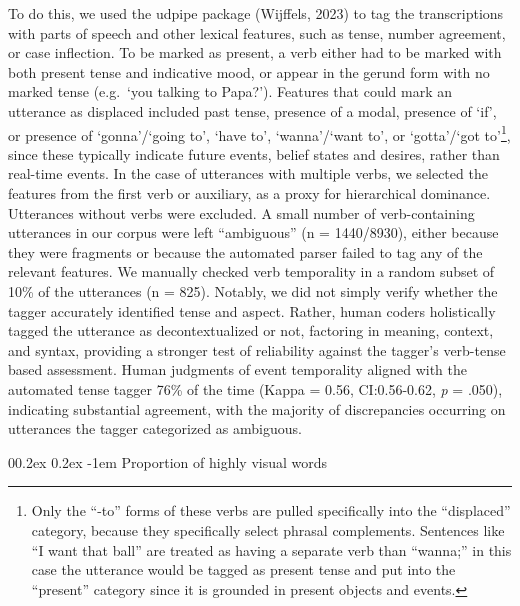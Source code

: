 \documentclass[
  man,floatsintext]{apa6}
\makeatletter
\let\oldparagraph\paragraph
\renewcommand{\paragraph}[1]{\oldparagraph{#1}\mbox{}}
\renewcommand{\paragraph}{\@startsection{paragraph}{4}{\parindent}%
  {0\baselineskip \@plus 0.2ex \@minus 0.2ex}%
  {-1em}%
  {\normalfont\normalsize\bfseries\itshape\typesectitle}}
\makeatother
\begin{document}
To do this, we used the udpipe package (Wijffels, 2023) to tag the transcriptions with parts of speech and other lexical features, such as tense, number agreement, or case inflection. To be marked as present, a verb either had to be marked with both present tense and indicative mood, or appear in the gerund form with no marked tense (e.g.~`you talking to Papa?'). Features that could mark an utterance as displaced included past tense, presence of a modal, presence of `if', or presence of `gonna'/`going to', `have to', `wanna'/`want to', or `gotta'/`got to'\footnote{Only the ``-to'' forms of these verbs are pulled specifically into the ``displaced'' category, because they specifically select phrasal complements. Sentences like ``I want that ball'' are treated as having a separate verb than ``wanna;'' in this case the utterance would be tagged as present tense and put into the ``present'' category since it is grounded in present objects and events.}, since these typically indicate future events, belief states and desires, rather than real-time events. In the case of utterances with multiple verbs, we selected the features from the first verb or auxiliary, as a proxy for hierarchical dominance. Utterances without verbs were excluded. A small number of verb-containing utterances in our corpus were left ``ambiguous'' (n = 1440/8930), either because they were fragments or because the automated parser failed to tag any of the relevant features. We manually checked verb temporality in a random subset of 10\% of the utterances (n = 825). Notably, we did not simply verify whether the tagger accurately identified tense and aspect. Rather, human coders holistically tagged the utterance as decontextualized or not, factoring in meaning, context, and syntax, providing a stronger test of reliability against the tagger's verb-tense based assessment. Human judgments of event temporality aligned with the automated tense tagger 76\% of the time (Kappa = 0.56, CI:0.56-0.62, \emph{p} = .050), indicating substantial agreement, with the majority of discrepancies occurring on utterances the tagger categorized as ambiguous.

\hypertarget{proportion-of-highly-visual-words}{%
\paragraph{Proportion of highly visual words}\label{proportion-of-highly-visual-words}}
\end{document}
